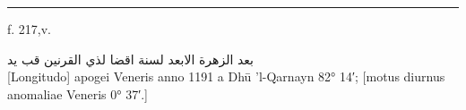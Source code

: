 \documentclass[11pt]{article}
\begin{document}
\clearpage
\noindent{}
\par\vspace{-1mm}\noindent\rule{\textwidth}{.4pt}\par\vspace{1mm}
\begin{center}{\small f. 217,v.}\end{center}\vspace{-3mm}
\begin{center}\textarabic{بعد الزهرة الابعد لسنة اقضا لذي القرنين قب يد}\\[1mm]{\small [Longitudo] apogei Veneris anno 1191 a Dhū ’l-Qarnayn 82° 14′; [motus diurnus anomaliae Veneris 0° 37′.]}\end{center}\vspace{-2mm}
\end{document}
